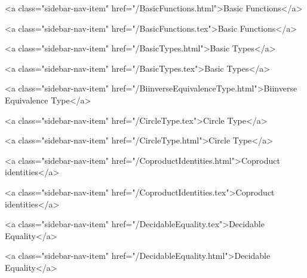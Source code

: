       
    
      
        
          <a class="sidebar-nav-item" href="/BasicFunctions.html">Basic Functions</a>
        
      
    
      
        
          <a class="sidebar-nav-item" href="/BasicFunctions.tex">Basic Functions</a>
        
      
    
      
        
          <a class="sidebar-nav-item" href="/BasicTypes.html">Basic Types</a>
        
      
    
      
        
          <a class="sidebar-nav-item" href="/BasicTypes.tex">Basic Types</a>
        
      
    
      
        
          <a class="sidebar-nav-item" href="/BiinverseEquivalenceType.html">Biinverse Equivalence Type</a>
        
      
    
      
        
          <a class="sidebar-nav-item" href="/CircleType.tex">Circle Type</a>
        
      
    
      
        
          <a class="sidebar-nav-item" href="/CircleType.html">Circle Type</a>
        
      
    
      
        
          <a class="sidebar-nav-item" href="/CoproductIdentities.html">Coproduct identities</a>
        
      
    
      
        
          <a class="sidebar-nav-item" href="/CoproductIdentities.tex">Coproduct identities</a>
        
      
    
      
        
          <a class="sidebar-nav-item" href="/DecidableEquality.tex">Decidable Equality</a>
        
      
    
      
        
          <a class="sidebar-nav-item" href="/DecidableEquality.html">Decidable Equality</a>
        
